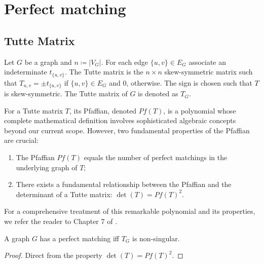 \chapter{Perfect matching}

\section{Tutte Matrix}

\begin{definition}[Indeterminates]

\end{definition}

\begin{definition}
\label{def:tutte_matrix}
    Let \(G\) be a graph and \(n \coloneqq |V_G|\).
    For each edge \(\{u,v\} \in E_G\) associate an indeterminate \(t_{\{u,v\}}\).
    The Tutte matrix is the \(n \times n\) skew-symmetric matrix such that \(T_{u,v} = \pm t_{\{u, v\}}\) if \(\{u,v\} \in E_G\) and \(0\), otherwise.
    The sign is chosen such that \(T\) is skew-symmetric.
    The Tutte matrix of \(G\) is denoted as \(T_G\).
\end{definition}

For a Tutte matrix \(T\), its Pfaffian, denoted \(Pf(T)\), is a polynomial whose complete mathematical definition involves sophisticated algebraic concepts beyond our current scope. 
However, two fundamental properties of the Pfaffian are crucial:
\begin{enumerate}
    \item The Pfaffian \(Pf(T)\) equals the number of perfect matchings in the underlying graph of \(T\);
    \item There exists a fundamental relationship between the Pfaffian and the determinant of a Tutte matrix: \(\det(T) = Pf(T)^2\). 
\end{enumerate}

For a comprehensive treatment of this remarkable polynomial and its properties, we refer the reader to Chapter 7 of \cite{Godsil:1993}.

\begin{fact}
    \label{fact:matching_condition}
    A graph \(G\) has a perfect matching iff \(T_G\) is non-singular.
\end{fact}

\begin{proof}
    Direct from the property \(\det(T) = Pf(T)^2\).
\end{proof}

